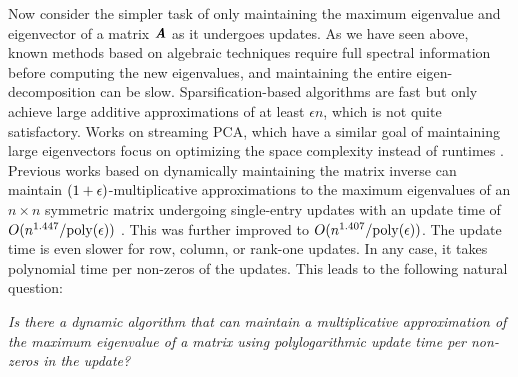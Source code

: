 Now consider the simpler task of only maintaining the maximum eigenvalue and eigenvector of a matrix $\AA$ as it undergoes updates. As we have seen above, known methods based on algebraic techniques require full spectral information before computing the new eigenvalues, and maintaining the entire eigen-decomposition can be slow. Sparsification-based algorithms are fast but only achieve large additive approximations of at least $\epsilon n$, which is not quite satisfactory. Works on streaming PCA, which have a similar goal of maintaining large eigenvectors focus on optimizing the space complexity instead of runtimes \cite{allen2017first}.
Previous works based on dynamically maintaining the matrix inverse can maintain $(1+\eps)$-multiplicative approximations to the maximum eigenvalues of an $n \times n$ symmetric matrix undergoing single-entry updates with an update time of $O(n^{1.447}/\poly(\eps))$ \cite{sankowski2004dynamic}. This was further improved to $O(n^{1.407}/\poly(\eps))$\cite{van2019dynamic}. The update time is even slower for row, column, or rank-one updates. In any case, it takes polynomial time per non-zeros of the updates. This leads to the following natural question:

\begin{center}
    \emph{Is there a dynamic algorithm that can maintain a multiplicative approximation of the maximum eigenvalue of a matrix using polylogarithmic update time per non-zeros in the update?}\par
\end{center}

